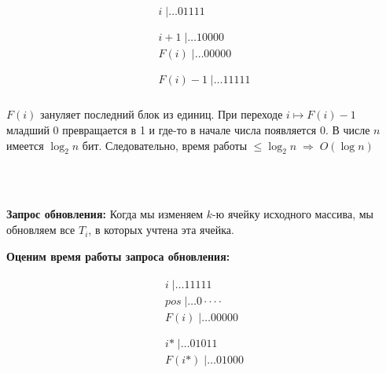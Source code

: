 \newline \begin{minipage}{0.3\textwidth}
  \begin{flushleft}
	$$
    \begin{array}{r}
    \begin{array}{r}
    i \;| \ldots01111\\
    \end{array} \\
    \hline
    \begin{array}{r}
    i+1 \;| \ldots10000\\
    F(i) \;| \ldots00000\\
    \end{array} \\
    \hline
    \begin{array}{r}
    F(i)-1 \;| \ldots11111\\
    \end{array}
    \end{array}
    $$
  \end{flushleft}
\end{minipage}
\begin{minipage}{0.7\textwidth}
\vspace{2ex}
  \begin{flushright}
	$F(i)$ зануляет последний блок из единиц. \newline При переходе $i \mapsto F(i)-1$ младший 0 превращается в 1 и где-то в начале числа появляется 0.
	\newline В числе $n$ имеется $\log_{2}{n}$ бит. Следовательно, время работы $\leq \log_{2}{n} \; \Rightarrow \; O(\log n)$
  \end{flushright}
\end{minipage}
\\ \\ \par \textbf{Запрос обновления:} Когда мы изменяем 
$k$-ю ячейку исходного массива, мы обновляем все $T_i$, в которых учтена эта ячейка.
\\ \par \textbf{Оценим время работы запроса обновления:}
\newline \begin{minipage}{0.3\textwidth}
  \begin{flushleft}
	$$
    \begin{array}{r}
    \begin{array}{r}
    i \;| \ldots11111\\
    pos \;| \ldots0 \cdot \cdot \cdot\cdot \\
    F(i) \;| \ldots00000\\
    \end{array} \\
    \hline
    \begin{array}{r}
    i\text{*} \;| \ldots01011\\
    F(i\text{*}) \;| \ldots01000\\
    \end{array} \\
    \end{array}
    $$
  \end{flushleft}
\end{minipage}
